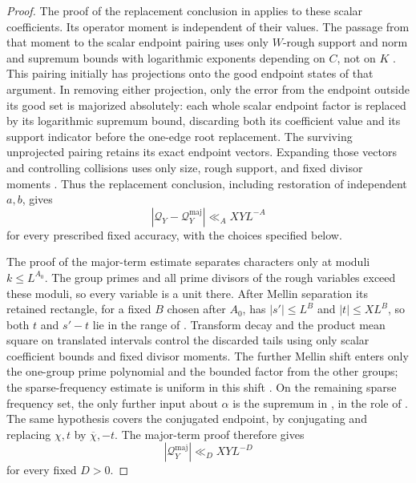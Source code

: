 \begin{proof}
The proof of the replacement conclusion in
\cite[Proposition~4.1]{PoissonDirichlet} applies to these scalar
coefficients.  Its operator moment is independent of their values.
The passage from that moment to the scalar endpoint pairing uses only
\(W\)-rough support and norm and supremum bounds with logarithmic
exponents depending on \(C\), not on \(K\)
\cite[Sections~3.2--3.3]{PoissonDirichlet}.  This pairing initially
has projections onto the good endpoint states of that argument.  In
removing either projection, only the error from the endpoint outside
its good set is majorized absolutely: each whole scalar endpoint factor
is replaced by its logarithmic supremum bound, discarding both its
coefficient value and its support indicator before the one-edge root
replacement.  The surviving unprojected pairing retains its exact
endpoint vectors.  Expanding those vectors and controlling collisions
uses only size, rough support, and fixed divisor moments
\cite[Section~4.9]{PoissonDirichlet}.  Thus the replacement conclusion,
including restoration of independent \(a,b\), gives
\begin{equation}\label{eq:type-ii-minor-transfer}
 |\mathcal Q_Y-\mathcal Q_Y^{\mathrm{maj}}|
       \ll_A XYL^{-A}
\end{equation}
for every prescribed fixed accuracy, with the choices specified below.

The proof of the major-term estimate
\cite[Proposition~5.1]{PoissonDirichlet} separates characters only at
moduli \(k\le L^{A_0}\).  The group primes and all prime divisors of
the rough variables exceed these moduli, so every variable is a unit
there.  After Mellin separation its retained rectangle, for a fixed
\(B\) chosen after \(A_0\), has \(|s'|\le L^B\) and
\(|t|\le XL^B\), so both \(t\) and \(s'-t\)
lie in the range of .
Transform decay and the product mean square on translated intervals
control the discarded tails using only scalar coefficient bounds and
fixed divisor moments.
The further Mellin shift enters only the one-group prime polynomial
and the bounded factor from the other groups; the sparse-frequency
estimate is uniform in this shift
\cite[Lemma~5.3]{PoissonDirichlet}.  On the remaining sparse frequency
set, the only further input about
\(\alpha\) is the supremum in
, in the role of
\cite[Lemma~5.2]{PoissonDirichlet}.  The same hypothesis covers the
conjugated endpoint, by conjugating and replacing \(\chi,t\) by
\(\overline\chi,-t\).  The major-term proof therefore gives
\begin{equation}\label{eq:type-ii-major-transfer}
 |\mathcal Q_Y^{\mathrm{maj}}|\ll_D XYL^{-D}
\end{equation}
for every fixed \(D>0\).


\end{proof}
